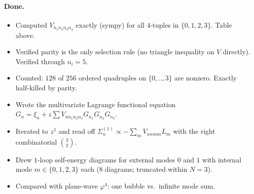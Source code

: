 \documentclass[11pt,a4paper]{article}
\begin{document}
\paragraph{Done.}
\begin{itemize}[leftmargin=2em,itemsep=2pt,topsep=2pt]
\item Computed $V_{n_{1}n_{2}n_{3}n_{4}}$ exactly (sympy) for all $4$-tuples in
$\{0,1,2,3\}$. Table above.
\item Verified parity is the only selection rule (no triangle inequality on $V$ directly).
Verified through $n_{i}=5$.
\item Counted: $128$ of $256$ ordered quadruples on $\{0,..,3\}$ are nonzero. Exactly
half-killed by parity.
\item Wrote the multivariate Lagrange functional equation
$G_{n}=\xi_{n}+z\sum V_{n n_{1}n_{2}n_{3}}G_{n_{1}}G_{n_{2}}G_{n_{3}}$.
\item Iterated to $z^{1}$ and read off $\Sigma_{n}^{(1)} \propto -\sum_{m}V_{nnmm}L_{m}$
with the right combinatorial $\binom{3}{2}$.
\item Drew $1$-loop self-energy diagrams for external modes $0$ and $1$ with internal mode
$m\in\{0,1,2,3\}$ each (8 diagrams; truncated within $N=3$).
\item Compared with plane-wave $\varphi^{4}$: one bubble vs.\ infinite mode sum.
\end{itemize}
\end{document}
